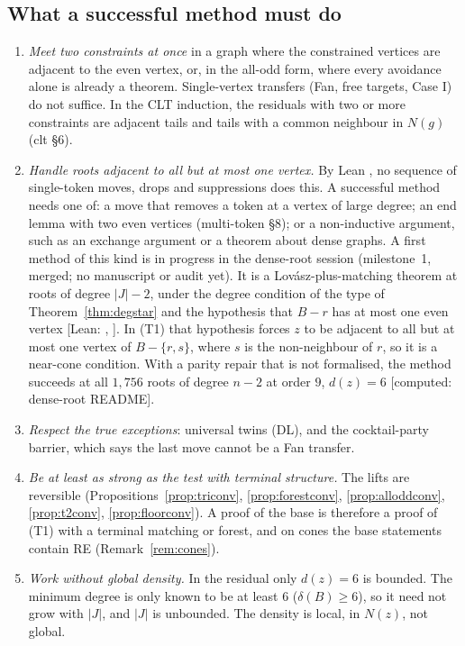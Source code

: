 \documentclass[11pt]{amsart}
\theoremstyle{definition}
\newcommand{\st}[1]{\textsf{\small[#1]}}
\begin{document}
\subsection{What a successful method must do}
\begin{enumerate}[leftmargin=*]
\item \emph{Meet two constraints at once} in a graph where the constrained vertices are adjacent to the
even vertex, or, in the all-odd form, where every avoidance alone is already a theorem. Single-vertex
transfers (Fan, free targets, Case I) do not suffice. In the CLT induction, the residuals with two or
more constraints are adjacent tails and tails with a common neighbour in $N(g)$ (clt \S6).
\item \emph{Handle roots adjacent to all but at most one vertex.} By Lean ,
no sequence of single-token moves, drops and suppressions does this. A successful method needs one of:
a move that removes a token at a vertex of large degree; an end lemma with two even vertices
(multi-token \S8); or a non-inductive argument, such as an exchange argument or a theorem about dense
graphs. A first method of this kind is in progress in the dense-root session (milestone~1, merged; no
manuscript or audit yet). It is a Lov\'asz-plus-matching theorem at roots of degree $|J|-2$, under the
degree condition of the type of Theorem~\ref{thm:degstar} and the hypothesis that $B-r$ has at most
one even vertex \st{Lean: , \lean{test1At_of_oneEven}}. In (T1) that
hypothesis forces $z$ to be adjacent to all but at most one vertex of $B-\{r,s\}$, where $s$ is the
non-neighbour of $r$, so it is a near-cone condition. With a parity repair that is not formalised, the method succeeds at all
$1{,}756$ roots of degree $n-2$ at order $9$, $d(z)=6$ \st{computed: dense-root README}.
\item \emph{Respect the true exceptions}: universal twins (DL), and the cocktail-party barrier, which
says the last move cannot be a Fan transfer.
\item \emph{Be at least as strong as the test with terminal structure.} The lifts are reversible
(Propositions~\ref{prop:triconv}, \ref{prop:forestconv}, \ref{prop:alloddconv}, \ref{prop:t2conv},
\ref{prop:floorconv}). A proof of the base is therefore a proof of (T1) with a terminal matching or
forest, and on cones the base statements contain RE (Remark~\ref{rem:cones}).
\item \emph{Work without global density.} In the residual only $d(z)=6$ is bounded. The minimum degree
is only known to be at least $6$ ($\delta(B)\ge6$), so it need not grow with $|J|$, and $|J|$ is
unbounded. The density is local, in $N(z)$, not global.
\end{enumerate}
\end{document}
